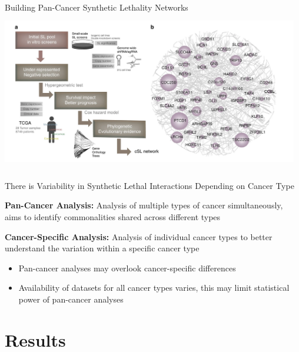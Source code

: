 \documentclass{beamer}
\begin{document}
	\begin{frame}{Building Pan-Cancer Synthetic Lethality Networks}
		\centering
		\includegraphics[width=13cm, height=7cm]{isle.png}
	\end{frame}

	\begin{frame}{There is Variability in Synthetic Lethal Interactions Depending on Cancer Type}
		
		\textbf{\color{blue}Pan-Cancer Analysis:} Analysis of multiple types of cancer simultaneously, aims to identify commonalities shared across different types
		
		
		\textbf{\color{blue}Cancer-Specific Analysis:} Analysis of individual cancer types to better understand the variation within a specific cancer type \vspace{1cm}
		
		\begin{itemize}
			\item Pan-cancer analyses may overlook cancer-specific differences
			\item Availability of datasets for all cancer types varies, this may limit statistical power of pan-cancer analyses
		\end{itemize}
		
	\end{frame}

	\section{Results}
	
\end{document}
